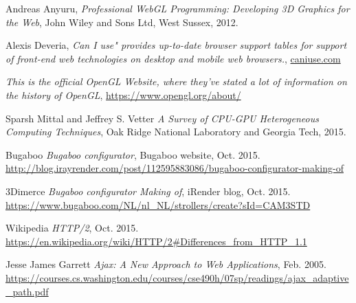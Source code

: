 
\begin{thebibliography}{9}

  Andreas Anyuru,
  \emph{Professional WebGL Programming: Developing 3D Graphics for the Web},
  John Wiley and Sons Ltd, West Sussex,
  2012.
  
  Alexis Deveria,
  \emph{Can I use" provides up-to-date browser support tables for support of front-end web technologies on desktop and mobile web browsers.},
  \url{caniuse.com}
  
	\emph{This is the official OpenGL Website, where they've stated a lot of information on the history of OpenGL},
	\url{https://www.opengl.org/about/}
	
	Sparsh Mittal and Jeffrey S. Vetter
	\emph{A Survey of CPU-GPU Heterogeneous Computing Techniques},
	Oak Ridge National Laboratory and Georgia Tech,
	2015.
	
	Bugaboo
	\emph{Bugaboo configurator},
	Bugaboo website,
	Oct. 2015.
	\url{http://blog.irayrender.com/post/112595883086/bugaboo-configurator-making-of}
	
	3Dimerce
	\emph{Bugaboo configurator Making of},
	iRender blog,
	Oct. 2015.
	\url{https://www.bugaboo.com/NL/nl_NL/strollers/create?sId=CAM3STD}
	
	Wikipedia
	\emph{HTTP/2},
	Oct. 2015.
	\url{https://en.wikipedia.org/wiki/HTTP/2#Differences_from_HTTP_1.1}
	
	Jesse James Garrett
	\emph{Ajax: A New Approach to Web Applications},
	Feb. 2005.
	\url{https://courses.cs.washington.edu/courses/cse490h/07sp/readings/ajax_adaptive_path.pdf}

\end{thebibliography}